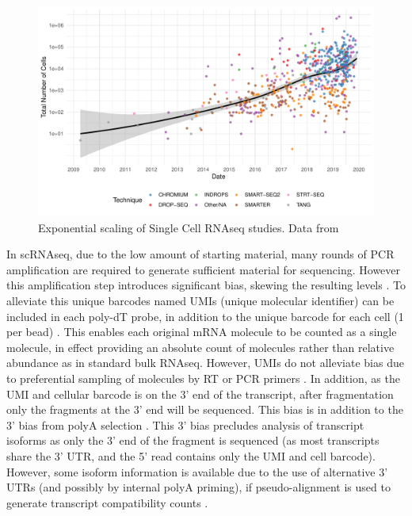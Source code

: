 \begin{figure}[H]
	\centering
	\includegraphics[width=\textwidth]{figures/intro/scStudies.pdf}
	\caption[scRNAseq Publications]{Exponential scaling of Single Cell RNAseq studies. Data from~\cite{Svensson2019curated}}
	\label{fig:scStudies}
\end{figure}

In scRNAseq, due to the low amount of starting material, many rounds of PCR amplification are required to generate sufficient material for sequencing.
However this amplification step introduces significant bias, skewing the resulting levels \parencite{Best2015Computational}.
To alleviate this unique barcodes named UMIs (unique molecular identifier) can be included in each poly-dT probe, in addition to the unique barcode for each cell (1 per bead) \parencite{Kivioja2012Counting,Islam2014Quantitative}.
This enables each original mRNA molecule to be counted as a single molecule, in effect providing an absolute count of molecules rather than relative abundance as in standard bulk RNAseq.
However, UMIs do not alleviate bias due to preferential sampling of molecules by RT or PCR primers \parencite{Kou2016Benefits}.
In addition, as the UMI and cellular barcode is on the 3' end of the transcript, after fragmentation only the fragments at the 3' end will be sequenced.
This bias is in addition to the 3' bias from polyA selection \parencite{Wan2012Modeling, Lahens2014IVTseq}.
This 3' bias precludes analysis of transcript isoforms as only the 3' end of the fragment is sequenced (as most transcripts share the 3' UTR, and the 5' read contains only the UMI and cell barcode).
However, some isoform information is available due to the use of alternative 3' UTRs (and possibly by internal polyA priming), if pseudo-alignment is used to generate transcript compatibility counts \parencite{Nam2002Oligo, Ntranos2019discriminative}.


